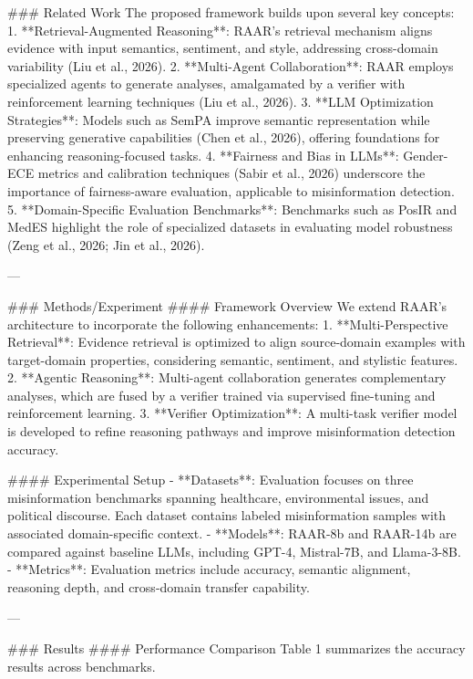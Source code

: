 ### Related Work
The proposed framework builds upon several key concepts:
1. **Retrieval-Augmented Reasoning**: RAAR's retrieval mechanism aligns evidence with input semantics, sentiment, and style, addressing cross-domain variability (Liu et al., 2026).
2. **Multi-Agent Collaboration**: RAAR employs specialized agents to generate analyses, amalgamated by a verifier with reinforcement learning techniques (Liu et al., 2026).
3. **LLM Optimization Strategies**: Models such as SemPA improve semantic representation while preserving generative capabilities (Chen et al., 2026), offering foundations for enhancing reasoning-focused tasks.
4. **Fairness and Bias in LLMs**: Gender-ECE metrics and calibration techniques (Sabir et al., 2026) underscore the importance of fairness-aware evaluation, applicable to misinformation detection.
5. **Domain-Specific Evaluation Benchmarks**: Benchmarks such as PosIR and MedES highlight the role of specialized datasets in evaluating model robustness (Zeng et al., 2026; Jin et al., 2026).

---

### Methods/Experiment
#### Framework Overview
We extend RAAR's architecture to incorporate the following enhancements:
1. **Multi-Perspective Retrieval**: Evidence retrieval is optimized to align source-domain examples with target-domain properties, considering semantic, sentiment, and stylistic features.
2. **Agentic Reasoning**: Multi-agent collaboration generates complementary analyses, which are fused by a verifier trained via supervised fine-tuning and reinforcement learning.
3. **Verifier Optimization**: A multi-task verifier model is developed to refine reasoning pathways and improve misinformation detection accuracy.

#### Experimental Setup
- **Datasets**: Evaluation focuses on three misinformation benchmarks spanning healthcare, environmental issues, and political discourse. Each dataset contains labeled misinformation samples with associated domain-specific context.
- **Models**: RAAR-8b and RAAR-14b are compared against baseline LLMs, including GPT-4, Mistral-7B, and Llama-3-8B.
- **Metrics**: Evaluation metrics include accuracy, semantic alignment, reasoning depth, and cross-domain transfer capability.

---

### Results
#### Performance Comparison
Table 1 summarizes the accuracy results across benchmarks.

